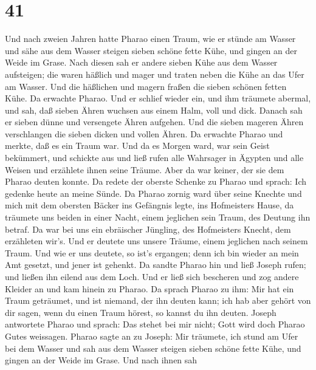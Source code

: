 \hypertarget{section-40}{%
\section{41}\label{section-40}}

 Und nach zweien Jahren hatte Pharao einen Traum, wie er
stünde am Wasser  und sähe aus dem Wasser steigen sieben
schöne fette Kühe, und gingen an der Weide im Grase.  Nach
diesen sah er andere sieben Kühe aus dem Wasser aufsteigen; die waren
häßlich und mager und traten neben die Kühe an das Ufer am Wasser.
 Und die häßlichen und magern fraßen die sieben schönen
fetten Kühe. Da erwachte Pharao.  Und er schlief wieder ein,
und ihm träumete abermal, und sah, daß sieben Ähren wuchsen aus einem
Halm, voll und dick.  Danach sah er sieben dünne und
versengete Ähren aufgehen.  Und die sieben mageren Ähren
verschlangen die sieben dicken und vollen Ähren. Da erwachte Pharao und
merkte, daß es ein Traum war.  Und da es Morgen ward, war
sein Geist bekümmert, und schickte aus und ließ rufen alle Wahrsager in
Ägypten und alle Weisen und erzählete ihnen seine Träume. Aber da war
keiner, der sie dem Pharao deuten konnte.  Da redete der
oberste Schenke zu Pharao und sprach: Ich gedenke heute an meine Sünde.
 Da Pharao zornig ward über seine Knechte und mich mit dem
obersten Bäcker ins Gefängnis legte, ins Hofmeisters Hause,
 da träumete uns beiden in einer Nacht, einem jeglichen
sein Traum, des Deutung ihn betraf.  Da war bei uns ein
ebräischer Jüngling, des Hofmeisters Knecht, dem erzähleten wir's. Und
er deutete uns unsere Träume, einem jeglichen nach seinem Traum.
 Und wie er uns deutete, so ist's ergangen; denn ich bin
wieder an mein Amt gesetzt, und jener ist gehenkt.  Da
sandte Pharao hin und ließ Joseph rufen; und ließen ihn eilend aus dem
Loch. Und er ließ sich bescheren und zog andere Kleider an und kam
hinein zu Pharao.  Da sprach Pharao zu ihm: Mir hat ein
Traum geträumet, und ist niemand, der ihn deuten kann; ich hab aber
gehört von dir sagen, wenn du einen Traum hörest, so kannst du ihn
deuten.  Joseph antwortete Pharao und sprach: Das stehet
bei mir nicht; Gott wird doch Pharao Gutes weissagen. 
Pharao sagte an zu Joseph: Mir träumete, ich stund am Ufer bei dem
Wasser  und sah aus dem Wasser steigen sieben schöne fette
Kühe, und gingen an der Weide im Grase.  Und nach ihnen sah
